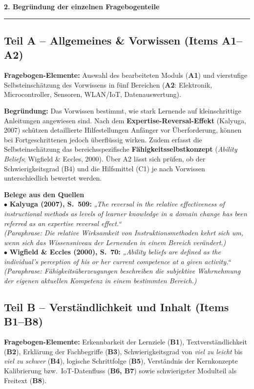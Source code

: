 \documentclass[a4paper,10pt]{article}
\newcommand{\sectionheader}[1]{%
  \vspace{6pt}
  {\large \bfseries \color{primary} #1}\\[-4pt]
  {\color{accent}\rule{\linewidth}{1.5pt}}\vspace{2pt}
}
\newcommand{\quotebox}[2]{%
  \begin{tcolorbox}[
    colback=lightgray,
    colframe=accent,
    arc=1.5mm,
    boxrule=0pt,
    leftrule=3pt,
    top=5pt, bottom=5pt, left=8pt, right=8pt
  ]
  {\small \textbf{\color{primary} #1}\\[2pt]
  #2}
  \end{tcolorbox}
}
\begin{document}
\sectionheader{2. Begründung der einzelnen Fragebogenteile}

\subsection*{\color{primary} Teil A – Allgemeines \& Vorwissen (Items A1–A2)}
\textbf{Fragebogen-Elemente:} Auswahl des bearbeiteten Moduls (\textbf{A1}) und vierstufige Selbsteinschätzung des Vorwissens in fünf Bereichen (\textbf{A2}: Elektronik, Microcontroller, Sensoren, WLAN/IoT, Datenauswertung).

\textbf{Begründung:} Das Vorwissen bestimmt, wie stark Lernende auf kleinschrittige Anleitungen angewiesen sind. Nach dem \textbf{Expertise-Reversal-Effekt} (Kalyuga, 2007) schützen detaillierte Hilfestellungen Anfänger vor Überforderung, können bei Fortgeschrittenen jedoch überflüssig wirken. Zudem erfasst die Selbsteinschätzung das bereichsspezifische \textbf{Fähigkeitsselbstkonzept} (\textit{Ability Beliefs}; Wigfield \& Eccles, 2000). Über A2 lässt sich prüfen, ob der Schwierigkeitsgrad (B4) und die Hilfsmittel (C1) je nach Vorwissen unterschiedlich bewertet werden.

\quotebox{Belege aus den Quellen}{
$\bullet$ \textbf{Kalyuga (2007), S.~509:} \textit{„The reversal in the relative effectiveness of instructional methods as levels of learner knowledge in a domain change has been referred as an expertise reversal effect.“} \\
\textit{(Paraphrase: Die relative Wirksamkeit von Instruktionsmethoden kehrt sich um, wenn sich das Wissensniveau der Lernenden in einem Bereich verändert.)}\\[3pt]
$\bullet$ \textbf{Wigfield \& Eccles (2000), S.~70:} \textit{„Ability beliefs are defined as the individual’s perception of his or her current competence at a given activity.“} \\
\textit{(Paraphrase: Fähigkeitsüberzeugungen beschreiben die subjektive Wahrnehmung der eigenen aktuellen Kompetenz in einem bestimmten Bereich.)}
}

\subsection*{\color{primary} Teil B – Verständlichkeit und Inhalt (Items B1–B8)}
\textbf{Fragebogen-Elemente:} Erkennbarkeit der Lernziele (\textbf{B1}), Textverständlichkeit (\textbf{B2}), Erklärung der Fachbegriffe (\textbf{B3}), Schwierigkeitsgrad von \textit{viel zu leicht} bis \textit{viel zu schwer} (\textbf{B4}), logische Schrittfolge (\textbf{B5}), Verständnis der Kernkonzepte Kalibrierung bzw.\ IoT-Datenfluss (\textbf{B6, B7}) sowie schwierigster Modulteil als Freitext (\textbf{B8}).
\end{document}
